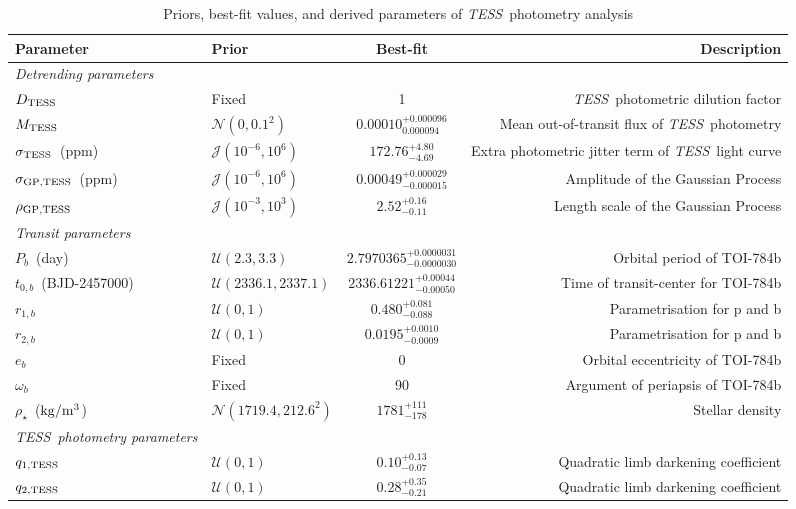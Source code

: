 \documentclass[twocolumn]{aastex631}
\newcommand{\tess}{\textit{TESS}\ }
\begin{document}
\begin{table}
 	\centering
 	\caption{Priors, best-fit values, and derived parameters of \tess photometry analysis}
 	\label{tab:priors-transit-planet-b}
 	\begin{tabular}{llcr} %
 		\hline
 		\hline
		Parameter & Prior & Best-fit & Description\\
 		\hline
		\textit{Detrending parameters}\\
		$D_{\rm{TESS}}$ & Fixed & 1 & \tess photometric dilution factor\\
		$M_{\rm{TESS}}$ & $\mathcal{N}(0, 0.1^2)$ & $0.00010^{+0.000096}_{0.000094}$ & Mean out-of-transit flux of \tess photometry\\
		$\sigma_{\rm{TESS}}$~(ppm) & $\mathcal{J}(10^{-6}, 10^6)$ & $172.76^{+4.80}_{-4.69}$ & Extra photometric jitter term of \tess light curve\\
		$\sigma_{\rm{GP}, \rm{TESS}}$~(ppm) & $\mathcal{J}(10^{-6}, 10^6)$ & $0.00049^{+0.000029}_{-0.000015}$ & Amplitude of the Gaussian Process\\
		$\rho_{\rm{GP}, \rm{TESS}}$ & $\mathcal{J}(10^{-3}, 10^3)$ & $2.52^{+0.16}_{-0.11}$ & Length scale of the Gaussian Process\\
		\textit{Transit parameters}\\
		$P_b$~(day) & $\mathcal{U}(2.3,3.3)$ & $2.7970365^{+0.0000031}_{-0.0000030}$ & Orbital period of TOI-784b\\
		$t_{0,b}$~(BJD-2457000) & $\mathcal{U}(2336.1,2337.1)$ & $2336.61221^{+0.00044}_{-0.00050}$ & Time of transit-center for TOI-784b\\
		$r_{1,b}$ & $\mathcal{U}(0,1)$ & $0.480^{+0.081}_{-0.088}$ & Parametrisation for p and b\\
		$r_{2,b}$ & $\mathcal{U}(0,1)$ & $0.0195^{+0.0010}_{-0.0009}$ & Parametrisation for p and b\\
		$e_b$ & Fixed & 0 & Orbital eccentricity of TOI-784b\\
		$\omega_b$ & Fixed & 90 & Argument of periapsis of TOI-784b\\
		$\rho_{\star}$~($\rm{kg/m^3}$) & $\mathcal{N}(1719.4, 212.6^2)$ & $1781^{+111}_{-178}$ & Stellar density\\
		\textit{\tess photometry parameters}\\
		$q_{1, \rm{TESS}}$ & $\mathcal{U}(0,1)$ & $0.10^{+0.13}_{-0.07}$ & Quadratic limb darkening coefficient\\
		$q_{2, \rm{TESS}}$ & $\mathcal{U}(0,1)$ & $0.28^{+0.35}_{-0.21}$ & Quadratic limb darkening coefficient\\

\end{tabular}
\end{table}
\end{document}
